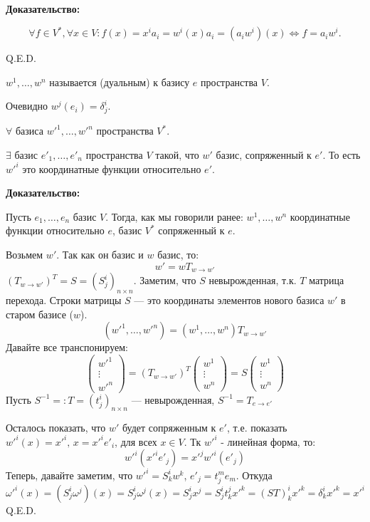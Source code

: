 \textbf{Доказательство:}

$$\forall f \in V^*, \forall x \in V: f(x) = x^ia_i = w^i(x)a_i = (a_iw^i)(x) \Leftrightarrow f = a_iw^i.$$

\hfill Q.E.D.


 $w^1,\ldots, w^n$ называется  (дуальным) к базису $e$ пространства $V$.

Очевидно $w^j(e_i) = \delta^i_j$.


$\forall$ базиса $w'^1,\ldots, w'^n$ пространства $V^*$.

$\exists$ базис $e'_1, \ldots, e'_n$ пространства $V$ такой, что $w'$ базис, сопряженный к $e'$. То есть $w'^{i} $ это координатные функции относительно $e'$.

\textbf{Доказательство:}


Пусть $e_1,\dots ,e_n \text{ базис } V$. Тогда, как мы говорили ранее:
$ w^1,\dots,w^n $ координатные функции относительно $e$, базис $V^*$ сопряженный к $e$.

Возьмем $w'$. Так как он базис и $w$ базис, то: $$ w' =wT_{w \rightarrow w'}$$
$(T_{w \to w'})^T=S=(S^i_j)_{n\times n}$. Заметим, что $S$ невырожденная, т.к. $T$ матрица перехода. Строки матрицы $S$ --- это координаты элементов нового базиса $w'$ в старом базисе ($w$).
$$(w'^1,\ldots,w'^n)=(w^1,\ldots,w^n)T_{w \to w'}$$
Давайте все транспонируем:
$$\begin{pmatrix}
    w'^1 \\
    \vdots \\
    {w'}^n
\end{pmatrix} = (T_{w \to w'})^T \begin{pmatrix}
    w^1 \\
    \vdots \\
    {w}^n
\end{pmatrix}= S \begin{pmatrix}
    w^1 \\
    \vdots \\
    {w}^n
\end{pmatrix}$$
Пусть $S^{-1}=:T=(t^i_j)_{n \times n}$ --- невырожденная, $S^{-1} =T_{e\rightarrow e'}$

Осталось показать, что $w'$ будет сопряженным к $e'$, т.е. показать ${w'}^{ i}(x)={x'}^i, \, x = {x'}^i {e'}_i$, для всех $ x \in V$. Тк $w'^i$ - линейная форма, то:
$${w'}^i({x'}^i{e'}_j)= {x'}^j {w'}^i(e'_j)$$
Теперь, давайте заметим, что ${w'}^i=S^i_kw^k$, $e'_j = t^m_je_m$. Откуда 
$$\omega'^i(x) = (S^i_j\omega^j)(x) = S^i_j\omega^j(x) = S^i_jx^j = S^i_jt^j_kx'^k = (ST)^i_kx'^k = \delta^i_kx'^{k} = x'^i$$
\hfill Q.E.D.


